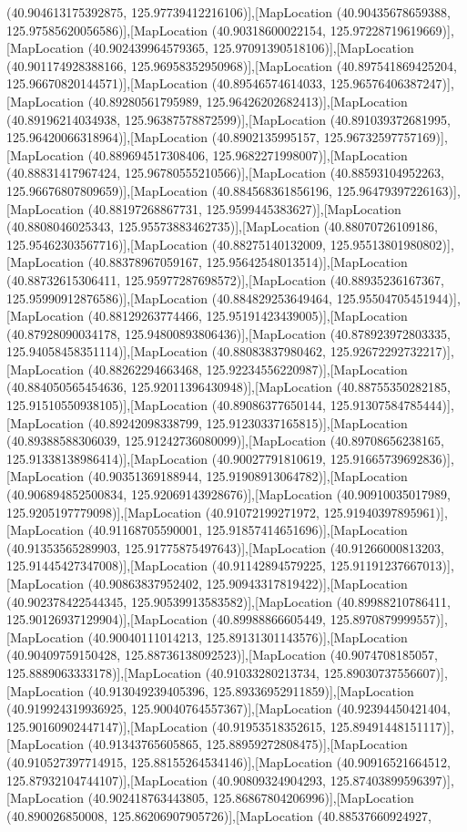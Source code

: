 (40.904613175392875, 125.97739412216106)],[MapLocation (40.90435678659388, 125.97585620056586)],[MapLocation (40.90318600022154, 125.97228719619669)],[MapLocation (40.902439964579365, 125.97091390518106)],[MapLocation (40.901174928388166, 125.96958352950968)],[MapLocation (40.897541869425204, 125.96670820144571)],[MapLocation (40.89546574614033, 125.96576406387247)],[MapLocation (40.89280561795989, 125.96426202682413)],[MapLocation (40.89196214034938, 125.96387578872599)],[MapLocation (40.891039372681995, 125.96420066318964)],[MapLocation (40.8902135995157, 125.96732597757169)],[MapLocation (40.889694517308406, 125.9682271998007)],[MapLocation (40.88831417967424, 125.96780555210566)],[MapLocation (40.88593104952263, 125.96676807809659)],[MapLocation (40.884568361856196, 125.96479397226163)],[MapLocation (40.88197268867731, 125.9599445383627)],[MapLocation (40.8808046025343, 125.95573883462735)],[MapLocation (40.88070726109186, 125.95462303567716)],[MapLocation (40.88275140132009, 125.95513801980802)],[MapLocation (40.88378967059167, 125.95642548013514)],[MapLocation (40.88732615306411, 125.95977287698572)],[MapLocation (40.88935236167367, 125.95990912876586)],[MapLocation (40.884829253649464, 125.95504705451944)],[MapLocation (40.88129263774466, 125.95191423439005)],[MapLocation (40.87928090034178, 125.94800893806436)],[MapLocation (40.878923972803335, 125.94058458351114)],[MapLocation (40.88083837980462, 125.92672292732217)],[MapLocation (40.88262294663468, 125.92234556220987)],[MapLocation (40.884050565454636, 125.92011396430948)],[MapLocation (40.88755350282185, 125.91510550938105)],[MapLocation (40.89086377650144, 125.91307584785444)],[MapLocation (40.89242098338799, 125.91230337165815)],[MapLocation (40.89388588306039, 125.91242736080099)],[MapLocation (40.89708656238165, 125.91338138986414)],[MapLocation (40.90027791810619, 125.91665739692836)],[MapLocation (40.90351369188944, 125.91908913064782)],[MapLocation (40.906894852500834, 125.92069143928676)],[MapLocation (40.90910035017989, 125.9205197779098)],[MapLocation (40.91072199271972, 125.91940397895961)],[MapLocation (40.91168705590001, 125.91857414651696)],[MapLocation (40.91353565289903, 125.91775875497643)],[MapLocation (40.91266000813203, 125.91445427347008)],[MapLocation (40.91142894579225, 125.91191237667013)],[MapLocation (40.90863837952402, 125.90943317819422)],[MapLocation (40.902378422544345, 125.90539913583582)],[MapLocation (40.89988210786411, 125.90126937129904)],[MapLocation (40.89988866605449, 125.8970879999557)],[MapLocation (40.90040111014213, 125.89131301143576)],[MapLocation (40.90409759150428, 125.88736138092523)],[MapLocation (40.9074708185057, 125.8889063333178)],[MapLocation (40.91033280213734, 125.89030737556607)],[MapLocation (40.913049239405396, 125.89336952911859)],[MapLocation (40.919924319936925, 125.90040764557367)],[MapLocation (40.92394450421404, 125.90160902447147)],[MapLocation (40.91953518352615, 125.89491448151117)],[MapLocation (40.91343765605865, 125.88959272808475)],[MapLocation (40.910527397714915, 125.88155264534146)],[MapLocation (40.90916521664512, 125.87932104744107)],[MapLocation (40.90809324904293, 125.87403899596397)],[MapLocation (40.902418763443805, 125.86867804206996)],[MapLocation (40.890026850008, 125.86206907905726)],[MapLocation (40.88537660924927, 